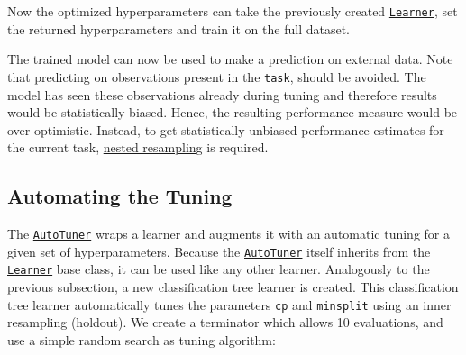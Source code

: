 \documentclass[
]{scrbook}
\newenvironment{Shaded}{\begin{snugshade}}{\end{snugshade}}
\newcommand{\FunctionTok}[1]{\textcolor[rgb]{0.00,0.00,0.00}{#1}}
\newcommand{\NormalTok}[1]{#1}
\newcommand{\OtherTok}[1]{\textcolor[rgb]{0.56,0.35,0.01}{#1}}
\newcommand{\SpecialCharTok}[1]{\textcolor[rgb]{0.00,0.00,0.00}{#1}}
\renewenvironment{Shaded} {\begin{snugshade}\small} {\end{snugshade}}
\begin{document}
Now the optimized hyperparameters can take the previously created \href{https://mlr3.mlr-org.com/reference/Learner.html}{\texttt{Learner}}, set the returned hyperparameters and train it on the full dataset.

\begin{Shaded}
\end{Shaded}

The trained model can now be used to make a prediction on external data.
Note that predicting on observations present in the \texttt{task}, should be avoided.
The model has seen these observations already during tuning and therefore results would be statistically biased.
Hence, the resulting performance measure would be over-optimistic.
Instead, to get statistically unbiased performance estimates for the current task, \protect\hyperlink{nested-resampling}{nested resampling} is required.

\hypertarget{autotuner}{%
\subsection{Automating the Tuning}\label{autotuner}}

The \href{https://mlr3tuning.mlr-org.com/reference/AutoTuner.html}{\texttt{AutoTuner}} wraps a learner and augments it with an automatic tuning for a given set of hyperparameters.
Because the \href{https://mlr3tuning.mlr-org.com/reference/AutoTuner.html}{\texttt{AutoTuner}} itself inherits from the \href{https://mlr3.mlr-org.com/reference/Learner.html}{\texttt{Learner}} base class, it can be used like any other learner.
Analogously to the previous subsection, a new classification tree learner is created.
This classification tree learner automatically tunes the parameters \texttt{cp} and \texttt{minsplit} using an inner resampling (holdout).
We create a terminator which allows 10 evaluations, and use a simple random search as tuning algorithm:
\end{document}
